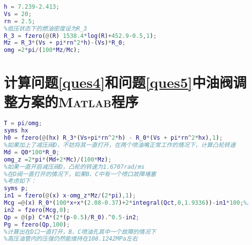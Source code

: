 \documentclass[withoutpreface,bwprint]{cumcmthesis} %
\begin{document}
\begin{appendices}
\begin{lstlisting}[language=matlab]
%由附件1
h = 7.239-2.413;
Vs = 20;
rn = 2.5;
%低压状态下的燃油密度设为R_3
R_3 = fzero(@(R) 1538.4*log(R)+452.9-0.5,1);
Mz = R_3*(Vs + pi*rn^2*h)-(Vs)*R_0;
omg =2*pi/(100*Mz/Mc);
\end{lstlisting}

\section{计算问题\ref{ques4}和问题\ref{ques5}中油阀调整方案的\textsc{Matlab}程序}
\begin{lstlisting}[language=matlab]
T = pi/omg;
syms hx
h0 = fzero(@(hx) R_3*(Vs+pi*rn^2*h) - R_0*(Vs + pi*rn^2*hx),1);
%如果加上了减压阀D，不妨将其一直打开，在两个喷油嘴正常工作的情况下，计算凸轮转速
Md = Q0*100*R_0;
omg_z =2*pi*(Md+2*Mc)/(100*Mz);
%如果一直开启减压阀D，凸轮的转速为1.6707rad/ms
%在D阀一直打开的情况下，如果B、C中有一个喷口故障堵塞
%考虑如下：
syms p;
in1 = fzero(@(x) x-omg_z*Mz/(2*pi),1);
Mcg =@(x) R_0*(100*x+x*(2.08-0.37)+2*integral(Qct,0,1.9336))-in1*100;%此处忽略燃油密度的变化
in2 = fzero(Mcg,0);
Qp = @(p) C*A*(2*(p-0.5)/R_0).^0.5-in2;
Pg = fzero(Qp,100);
%计算出在D口一直打开，B、C喷油孔其中一个故障的情况下
%高压油管内的压强仍然能维持在108.1242MPa左右
\end{lstlisting}

\end{appendices}
\end{document}
